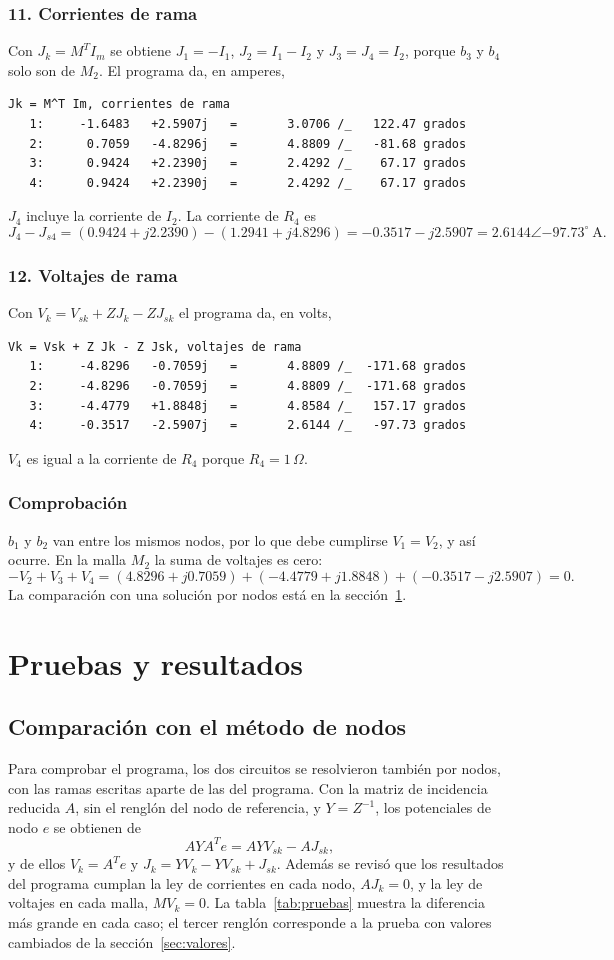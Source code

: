 \documentclass[12pt, letterpaper]{article}
\newcommand{\pol}[2]{#1\angle {#2}^{\circ}}
\newcommand{\paso}[1]{\subsubsection*{#1}}
\begin{document}
\paso{11. Corrientes de rama}

Con $J_k = M^T I_m$ se obtiene $J_1 = -I_1$, $J_2 = I_1 - I_2$ y $J_3 = J_4 = I_2$, porque $b_3$ y $b_4$ solo son de $M_2$.
El programa da, en amperes,
\begin{lstlisting}[style=salida]
Jk = M^T Im, corrientes de rama
   1:     -1.6483   +2.5907j   =       3.0706 /_   122.47 grados
   2:      0.7059   -4.8296j   =       4.8809 /_   -81.68 grados
   3:      0.9424   +2.2390j   =       2.4292 /_    67.17 grados
   4:      0.9424   +2.2390j   =       2.4292 /_    67.17 grados
\end{lstlisting}

$J_4$ incluye la corriente de $I_2$. La corriente de $R_4$ es
\[
J_4 - J_{s4} = (0.9424 + j2.2390) - (1.2941 + j4.8296) = -0.3517 - j2.5907 = \pol{2.6144}{-97.73}\ \text{A}.
\]

\paso{12. Voltajes de rama}

Con $V_k = V_{sk} + Z J_k - Z J_{sk}$ el programa da, en volts,
\begin{lstlisting}[style=salida]
Vk = Vsk + Z Jk - Z Jsk, voltajes de rama
   1:     -4.8296   -0.7059j   =       4.8809 /_  -171.68 grados
   2:     -4.8296   -0.7059j   =       4.8809 /_  -171.68 grados
   3:     -4.4779   +1.8848j   =       4.8584 /_   157.17 grados
   4:     -0.3517   -2.5907j   =       2.6144 /_   -97.73 grados
\end{lstlisting}
$V_4$ es igual a la corriente de $R_4$ porque $R_4 = 1\,\Omega$.

\paso{Comprobación}

$b_1$ y $b_2$ van entre los mismos nodos, por lo que debe cumplirse $V_1 = V_2$, y así ocurre. En la malla $M_2$ la
suma de voltajes es cero:
\[
-V_2 + V_3 + V_4 = (4.8296 + j0.7059) + (-4.4779 + j1.8848) + (-0.3517 - j2.5907) = 0 .
\]
La comparación con una solución por nodos está en la sección~\ref{sec:pruebas}.

\clearpage
\section{Pruebas y resultados}
\label{sec:pruebas}

\subsection{Comparación con el método de nodos}

Para comprobar el programa, los dos circuitos se resolvieron también por nodos, con las ramas escritas aparte de las
del programa. Con la matriz de incidencia reducida $A$, sin el renglón del nodo de referencia, y $Y = Z^{-1}$, los
potenciales de nodo $e$ se obtienen de
\[
  A Y A^T e = A Y V_{sk} - A J_{sk},
\]
y de ellos $V_k = A^T e$ y $J_k = Y V_k - Y V_{sk} + J_{sk}$. Además se revisó que los resultados del programa
cumplan la ley de corrientes en cada nodo, $A J_k = 0$, y la ley de voltajes en cada malla, $M V_k = 0$. La
tabla~\ref{tab:pruebas} muestra la diferencia más grande en cada caso; el tercer renglón corresponde a la prueba con
valores cambiados de la sección~\ref{sec:valores}.
\end{document}
